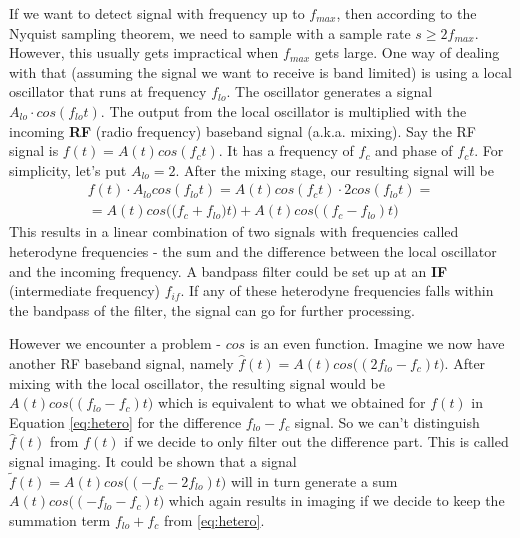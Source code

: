 \documentclass[a4paper,12pt,twoside,openright]{report}
\begin{document}
If we want to detect signal with frequency up to $f_{max}$, then according to the Nyquist sampling theorem, we need to sample with a sample rate $s \geq 2 f_{max}$. However, this usually gets impractical when $f_{max}$ gets large. One way of dealing with that (assuming the signal we want to receive is band limited) is using a local oscillator that runs at frequency $f_{lo}$. The oscillator generates a signal $A_{lo} \cdot cos(f_{lo} t)$. The output from the local oscillator is multiplied with the incoming \textbf{RF} (radio frequency) baseband signal (a.k.a. mixing). Say the RF signal is $f(t) = A(t) cos(f_{c} t)$. It has a frequency of $f_{c}$ and phase of $f_{c} t$. For simplicity, let's put $A_{lo} = 2$. After the mixing stage, our resulting signal will be
\begin{multline}
\label{eq:hetero}
f(t) \cdot A_{lo} cos(f_{lo} t) =  A(t) cos(f_{c} t) \cdot 2 cos(f_{lo} t) = \\
=  A(t) cos\big( (f_{c} + f_{lo} \big) t\big) + A(t) cos\big( (f_{c} - f_{lo}) t \big)
\end{multline}
This results in a linear combination of two signals with frequencies called heterodyne frequencies - the sum and the difference between the local oscillator and the incoming frequency. A bandpass filter could be set up at an \textbf{IF} (intermediate frequency) $f_{if}$. If any of these heterodyne frequencies falls within the bandpass of the filter, the signal can go for further processing.

However we encounter a problem - $cos$ is an even function. Imagine we now have another RF baseband signal, namely $\hat{f}(t) = A(t) cos\big( (2 f_{lo} - f_{c}) t\big)$. After mixing with the local oscillator, the resulting signal would be $A(t) cos\big( (f_{lo} - f_{c}) t \big)$ which is equivalent to what we obtained for $f(t)$ in Equation \ref{eq:hetero} for the difference $f_{lo} - f_{c}$ signal. So we can't distinguish $\hat{f}(t)$ from $f(t)$ if we decide to only filter out the difference part. This is called signal imaging. It could be shown that a signal $\tilde{f}(t) = A(t) cos\big( (- f_{c} - 2 f_{lo}) t\big)$ will in turn generate a sum $A(t) cos\big( ( - f_{lo} - f_{c}) t \big)$ which again results in imaging if we decide to keep the summation term $f_{lo} + f_{c}$ from \ref{eq:hetero}.
\end{document}
